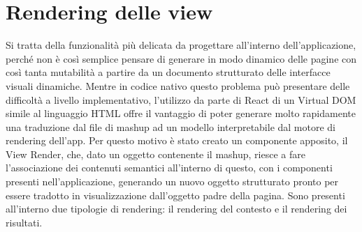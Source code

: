 \section{Rendering delle view}\label{sec:rendering-view}

Si tratta della funzionalità più delicata da progettare all'interno dell'applicazione, perché non è così semplice pensare di generare in modo dinamico delle pagine con così tanta mutabilità a partire da un documento strutturato delle interfacce visuali dinamiche.
Mentre in codice nativo questo problema può presentare delle difficoltà a livello implementativo, l'utilizzo da parte di React di un Virtual DOM simile al linguaggio HTML offre il vantaggio di poter generare molto rapidamente una traduzione dal file di mashup ad un modello interpretabile dal motore di rendering dell'app.
Per questo motivo è stato creato un componente apposito, il View Render, che, dato un oggetto contenente il mashup, riesce a fare l'associazione dei contenuti semantici all'interno di questo, con i componenti presenti nell'applicazione, generando un nuovo oggetto strutturato pronto per essere tradotto in visualizzazione dall'oggetto padre della pagina.
Sono presenti all'interno due tipologie di rendering: il rendering del contesto e il rendering dei risultati.

